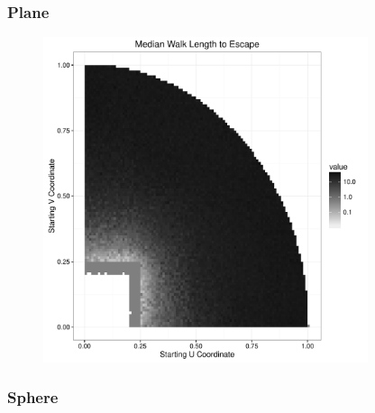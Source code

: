 \documentclass{beamer}
\begin{document}
\begin{frame}
	
	\frametitle{Plane}
	
	\begin{figure}
		\includegraphics[width=0.85\textwidth]{images/PlaneCircleL05.pdf}
	\end{figure}
	
\end{frame}



\begin{frame}
	
	\frametitle{Sphere}
	
	\begin{figure}
		
	\end{figure}
	
\end{frame}
\end{document}
